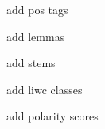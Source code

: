 
\begin{DoxyRefList}
\item[\label{todo__todo000001}%
\hypertarget{todo__todo000001}{}%
\-Member \hyperlink{namespacemodules_1_1pyuima_1_1CorpusFeatures_a31c3778898e058fa98abb81ed7b94c86}{modules\-:\-:pyuima\-:\-:\-Corpus\-Features.corpus\-Frequent\-Words} ]add pos tags 

add lemmas 

add stems 

add liwc classes 

add polarity scores 
\end{DoxyRefList}